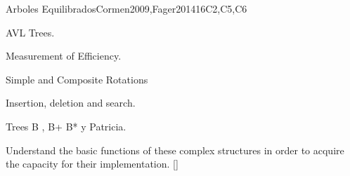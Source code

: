 \begin{syllabus}
\begin{unit}{}{Arboles Equilibrados}{Cormen2009,Fager2014}{16}{C2,C5,C6}
   \begin{topics}
        \item AVL Trees.
	\item Measurement of Efficiency.
	\item Simple and Composite Rotations
	\item Insertion, deletion and search.
	\item Trees B , B+ B* y Patricia.
   \end{topics}

   \begin{learningoutcomes}
      \item Understand the basic functions of these complex structures in order to acquire the capacity for their implementation. [\Assessment]
   \end{learningoutcomes}
\end{unit}



\begin{coursebibliography}
\end{coursebibliography}

\end{syllabus}
